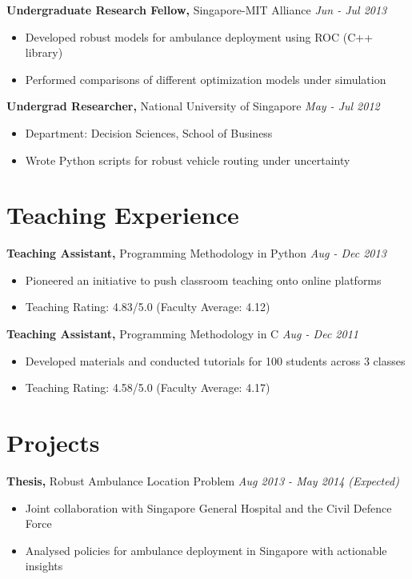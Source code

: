 \documentclass[margin]{res}
\begin{document}
\begin{resume}
{\bf Undergraduate Research Fellow,} Singapore-MIT Alliance \hfill \textit{Jun - Jul 2013}
\begin{itemize} \itemsep -2pt %
\item Developed robust models for ambulance deployment using ROC (C++ library)
\item Performed comparisons of different optimization models under simulation
\end{itemize}

{\bf Undergrad Researcher,} National University of Singapore \hfill \textit{May - Jul 2012}
\begin{itemize} \itemsep -2pt
\item Department: Decision Sciences, School of Business
\item Wrote Python scripts for robust vehicle routing under uncertainty
\end{itemize}

\section{Teaching Experience}
{\bf Teaching Assistant,} Programming Methodology in Python \hfill \textit{Aug - Dec 2013}
\begin{itemize} \itemsep -2pt
\item Pioneered an initiative to push classroom teaching onto online platforms
\item Teaching Rating: 4.83/5.0 (Faculty Average: 4.12)
\end{itemize}

{\bf Teaching Assistant,} Programming Methodology in C \hfill \textit{Aug - Dec 2011}
\begin{itemize} \itemsep -2pt
\item Developed materials and conducted tutorials for 100 students across 3 classes
\item Teaching Rating: 4.58/5.0 (Faculty Average: 4.17)
\end{itemize}

\section{Projects}
{\bf Thesis,} Robust Ambulance Location Problem \hfill \textit{Aug 2013 - May 2014 (Expected)}
\begin{itemize} \itemsep -2pt
\item Joint collaboration with Singapore General Hospital and the Civil Defence Force
\item Analysed policies for ambulance deployment in Singapore with actionable insights
\end{itemize}


\end{resume}
\end{document}
